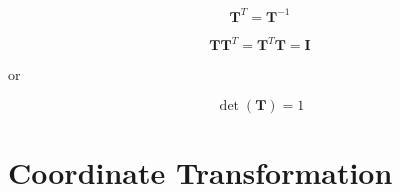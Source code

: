 \begin{enumerate}
\begin{bbox}[0.85]
            \begin{equation}
                \mathbf{T}^{T} = \mathbf{T}^{-1}
            \end{equation}

            \begin{equation}
                \mathbf{T}\mathbf{T}^{T} = \mathbf{T}^{T}\mathbf{T} = \mathbf{I}
            \end{equation}

            or

            \begin{equation}
                \det(\mathbf{T}) = 1
            \end{equation}

        \end{bbox}

\end{enumerate}


\section{Coordinate Transformation}

